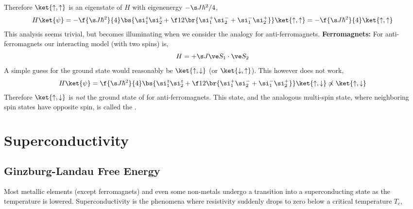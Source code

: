 \documentclass{article}
\newcommand{\uu}{\uparrow}
\newcommand{\dd}{\downarrow}
\begin{document}
Therefore $\ket{\uu, \uu}$ is an eigenstate of $H$ with eigenenergy $- \s J \hbar^2 / 4$,
\[ H \ket{\psi} = -\f{\s J \hbar^2}{4}\bs{\si_1^{z}\si_2^{z} + \f12 \br{\si_1^+ \si_2^- + \si_1^- \si_2^+}} \ket{\uu, \uu} = - \f{\s J \hbar^2}{4}\ket{\uu, \uu} \]
This analysis seems trivial, but becomes illuminating when we consider the analogy for anti-ferromagnets.
\textbf{Ferromagnets:}
For anti-ferromagnets our interacting model (with two spins) is,
\[ H = + \s J \ve S_1 \cdot \ve S_2 \]
A simple guess for the ground state would reasonably be $\ket{\uu, \dd}$ (or $\ket{\dd, \uu}$). This however does not work,
\[ H \ket{\psi} = \f{\s J \hbar^2}{4}\bs{\si_1^{z}\si_2^{z} + \f12 \br{\si_1^+ \si_2^- + \si_1^- \si_2^+}} \ket{\uu, \dd} \not \propto \ket{\uu, \dd} \]
Therefore $\ket{\uu, \dd}$ is \textit{not} the ground state of for anti-ferromagnets. This state, and the analogous multi-spin state, where neighboring spin states have opposite spin, is called the .
\begin{center}
\end{center}

\section{Superconductivity}
\subsection{Ginzburg-Landau Free Energy}
Most metallic elements (except ferromagnets) and even some non-metals undergo a transition into a superconducting state as the temperature is lowered. Superconductivity is the phenomena where resistivity suddenly drops to zero below a critical temperature $T_c$,

\begin{center}
\end{center}
\end{document}
